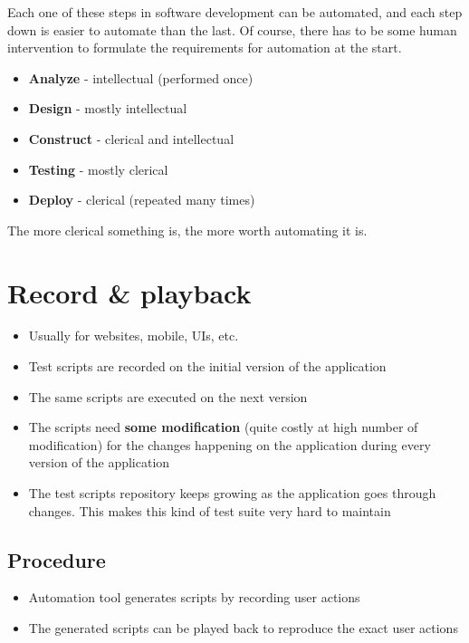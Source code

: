 \documentclass[12pt]{book}
\begin{document}
Each one of these steps in software development can be automated, and each step down is easier to automate than the last. Of course, there has to be some human intervention to formulate the requirements for automation at the start.

\begin{itemize}
    \item \textbf{Analyze} - intellectual (performed once)
    \item \textbf{Design} - mostly intellectual
    \item \textbf{Construct} - clerical and intellectual
    \item \textbf{Testing} - mostly clerical
    \item \textbf{Deploy} - clerical (repeated many times)
\end{itemize}

The more clerical something is, the more worth automating it is.

\section{Record \& playback}

\begin{itemize}
    \item Usually for websites, mobile, UIs, etc.
    \item Test scripts are recorded on the initial version of the application
    \item The same scripts are executed on the next version
    \item The scripts need \textbf{some modification} (quite costly at high number of modification) for the changes happening on the application during every version of the application
    \item The test scripts repository keeps growing as the application goes through changes. This makes this kind of test suite very hard to maintain
\end{itemize}

\subsection{Procedure}
\begin{itemize}
    \item Automation tool generates scripts by recording user actions
    \item The generated scripts can be played back to reproduce the exact user actions
\end{itemize}
\end{document}
